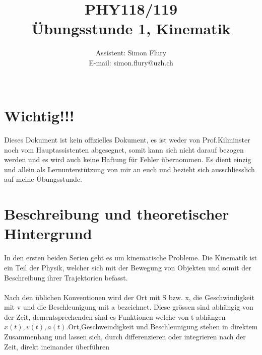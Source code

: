 \documentclass[12pt]{article}
\begin{document}
\title{PHY118/119 \\ {\bf Übungsstunde 1, Kinematik}}
\author{Assistent: Simon Flury \\E-mail: simon.flury@uzh.ch\\\\ }
\maketitle

\section{Wichtig!!!}
Dieses Dokument ist kein offizielles Dokument, es ist weder von Prof.Kilminster noch vom Hauptassistenten abgesegnet, somit kann sich nicht darauf bezogen werden und es wird auch keine Haftung für Fehler übernommen. Es dient einzig und allein als Lernunterstützung von mir an euch und bezieht sich ausschliesslich auf meine Übungsstunde.
\section{Beschreibung und theoretischer Hintergrund}
In  den ersten beiden Serien geht es um kinematische Probleme. Die Kinematik ist ein Teil der Physik, welcher sich mit der Bewegung von Objekten und somit der Beschreibung ihrer Trajektorien befasst.\\
\\ Nach den üblichen Konventionen wird der Ort mit S bzw. x, die Geschwindigkeit mit v und die Beschleunigung mit a bezeichnet. Diese grössen sind abhängig von der Zeit, dementsprechenden sind es Funktionen welche von t abhängen $x(t), v(t), a(t)$.Ort,Geschweindigkeit und Beschleunigung stehen in direktem Zusammenhang und lassen sich, durch differenzieren oder integrieren nach der Zeit, direkt ineinander überführen
\end{document}
